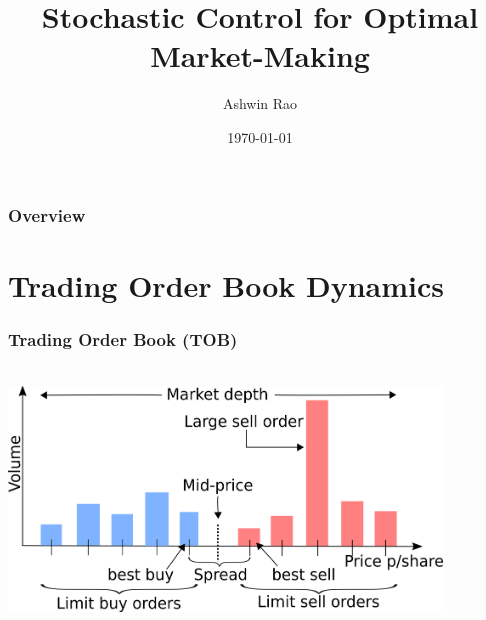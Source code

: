 \documentclass[handout]{beamer}
\title[Optimal Market-Making]{Stochastic Control for Optimal Market-Making} %
\author{Ashwin Rao} %
\institute[Stanford] %
{
ICME, Stanford University
}
\date{\today} %
\begin{document}
\begin{frame}
\titlepage %
\end{frame}

\begin{frame}
\frametitle{Overview} %
\tableofcontents %
\end{frame}

\section{Trading Order Book Dynamics}

\begin{frame}
\frametitle{Trading Order Book (TOB)}
\includegraphics[width=11.5cm, height=7cm]{order_book.png}
\end{frame}
\end{document}
